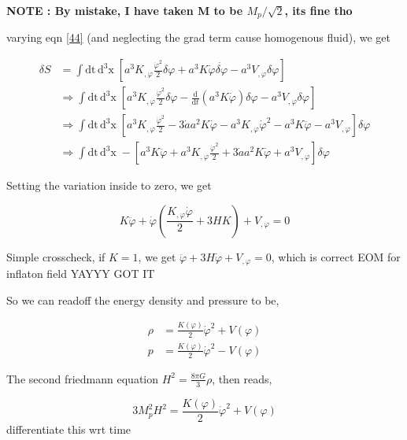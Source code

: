 \documentclass{article}
\begin{document}
\textbf{NOTE : By mistake, I have taken M to be $M_p/\sqrt{2}$, its fine tho}

varying eqn \ref{44} (and neglecting the grad term cause homogenous fluid), we get

\begin{align}
    \delta S &= \int \text{dt}\,\text{d}^3\text{x} \;  \left[ a^3K_{,\varphi} \frac{\dot{\varphi}^2}{2} \delta \varphi + a^3 K \dot{\varphi} \dot{\delta \varphi} - a^3V_{,\varphi} \delta\varphi \right] \nonumber \\
    &\Rightarrow \int \text{dt}\,\text{d}^3\text{x} \;  \left[ a^3K_{,\varphi} \frac{\dot{\varphi}^2}{2} \delta \varphi - \frac{\text{d}}{\text{d}t}(a^3 K \dot{\varphi}) \delta \varphi - a^3V_{,\varphi} \delta\varphi \right] \nonumber \\
    &\Rightarrow \int \text{dt}\,\text{d}^3\text{x} \;  \left[ a^3K_{,\varphi} \frac{\dot{\varphi}^2}{2}  -  3\dot{a} a^2 K \dot{\varphi} - a^3 K_{,\varphi}\dot{\varphi}^2 - a^3 K \ddot{\varphi} - a^3V_{,\varphi}  \right]\delta \varphi
    \nonumber \\
    &\Rightarrow \int \text{dt}\,\text{d}^3\text{x} \; - \left[ a^3 K \ddot{\varphi} + a^3K_{,\varphi} \frac{\dot{\varphi}^2}{2}  +  3\dot{a} a^2 K \dot{\varphi} + a^3V_{,\varphi}  \right]\delta \varphi
\end{align}

Setting the variation inside to zero, we get

\begin{equation} \label{47}
    K \ddot{\varphi} + \dot{\varphi} \left(\frac{K_{,\varphi} \dot{\varphi}}{2} + 3H K \right) + V_{,\varphi}   = 0
\end{equation}

Simple crosscheck, if $K = 1$, we get $ \ddot{\varphi} +  3H \dot{\varphi}  + V_{,\varphi}   = 0$, which is correct EOM for inflaton field
YAYYY GOT IT

So we can readoff the energy density and pressure to be,

\begin{align}
    \rho &= \frac{K(\varphi)}{2} \dot{\varphi}^2 + V(\varphi) \nonumber \\
    p &= \frac{K(\varphi)}{2} \dot{\varphi}^2 - V(\varphi)
\end{align}

The second friedmann equation $H^2 = \frac{8 \pi G}{3} \rho$, then reads, 

\begin{equation}    \label{Friedmann Eqn 2}
    3 M_p^2H^2 = \frac{K(\varphi)}{2} \dot{\varphi}^2 + V(\varphi)
\end{equation}
differentiate this wrt time
\end{document}
